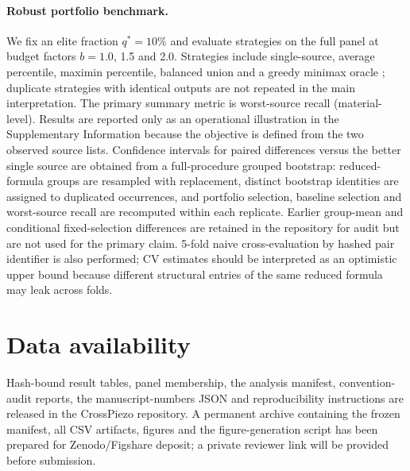 \documentclass[11pt]{article}
\begin{document}
\paragraph{Robust portfolio benchmark.}
We fix an elite fraction $q^*=10\%$ and evaluate strategies on the full panel at budget factors $b=1.0$, 1.5 and 2.0.
Strategies include single-source, average percentile, maximin percentile, balanced union and a greedy minimax oracle \cite{dwork2001,clemen1986}; duplicate strategies with identical outputs are not repeated in the main interpretation.
The primary summary metric is worst-source recall (material-level). Results are reported only as an operational illustration in the Supplementary Information because the objective is defined from the two observed source lists.
Confidence intervals for paired differences versus the better single source are obtained from a full-procedure grouped bootstrap: reduced-formula groups are resampled with replacement, distinct bootstrap identities are assigned to duplicated occurrences, and portfolio selection, baseline selection and worst-source recall are recomputed within each replicate.
Earlier group-mean and conditional fixed-selection differences are retained in the repository for audit but are not used for the primary claim.
5-fold naive cross-evaluation by hashed pair identifier is also performed; CV estimates should be interpreted as an optimistic upper bound because different structural entries of the same reduced formula may leak across folds.

\section{Data availability}
\label{sec:data}
Hash-bound result tables, panel membership, the analysis manifest, convention-audit reports, the manuscript-numbers JSON and reproducibility instructions are released in the CrossPiezo repository.
A permanent archive containing the frozen manifest, all CSV artifacts, figures and the figure-generation script has been prepared for Zenodo/Figshare deposit; a private reviewer link will be provided before submission.

\begingroup
\small


\endgroup
\end{document}
